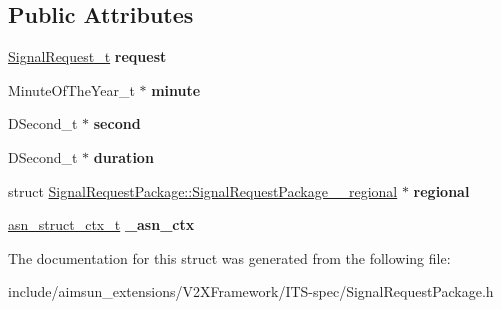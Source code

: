 \subsection*{Public Attributes}
\begin{DoxyCompactItemize}
\item 
\hyperlink{structSignalRequest}{Signal\+Request\+\_\+t} {\bfseries request}\hypertarget{structSignalRequestPackage_a6ea3068f0722167755eed4a6fe68f79e}{}\label{structSignalRequestPackage_a6ea3068f0722167755eed4a6fe68f79e}

\item 
Minute\+Of\+The\+Year\+\_\+t $\ast$ {\bfseries minute}\hypertarget{structSignalRequestPackage_aa9e5b1168a3b2c48603849a2fb683366}{}\label{structSignalRequestPackage_aa9e5b1168a3b2c48603849a2fb683366}

\item 
D\+Second\+\_\+t $\ast$ {\bfseries second}\hypertarget{structSignalRequestPackage_a4ceec6674d61564a620e02ed6880c9c7}{}\label{structSignalRequestPackage_a4ceec6674d61564a620e02ed6880c9c7}

\item 
D\+Second\+\_\+t $\ast$ {\bfseries duration}\hypertarget{structSignalRequestPackage_a55081bb7da94f33753e29a2ddef8ca3f}{}\label{structSignalRequestPackage_a55081bb7da94f33753e29a2ddef8ca3f}

\item 
struct \hyperlink{structSignalRequestPackage_1_1SignalRequestPackage____regional}{Signal\+Request\+Package\+::\+Signal\+Request\+Package\+\_\+\+\_\+regional} $\ast$ {\bfseries regional}\hypertarget{structSignalRequestPackage_ad6415302edc59303e828111222b68459}{}\label{structSignalRequestPackage_ad6415302edc59303e828111222b68459}

\item 
\hyperlink{structasn__struct__ctx__s}{asn\+\_\+struct\+\_\+ctx\+\_\+t} {\bfseries \+\_\+asn\+\_\+ctx}\hypertarget{structSignalRequestPackage_ab14116e820ea75a73425607ea7d74a16}{}\label{structSignalRequestPackage_ab14116e820ea75a73425607ea7d74a16}

\end{DoxyCompactItemize}


The documentation for this struct was generated from the following file\+:\begin{DoxyCompactItemize}
\item 
include/aimsun\+\_\+extensions/\+V2\+X\+Framework/\+I\+T\+S-\/spec/Signal\+Request\+Package.\+h\end{DoxyCompactItemize}

